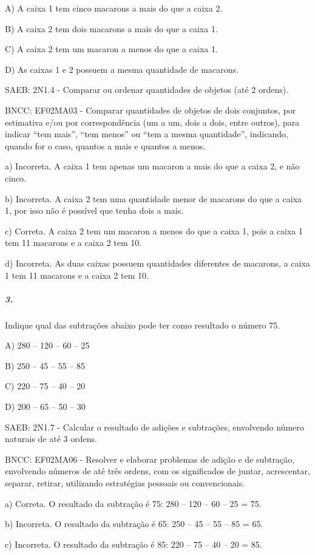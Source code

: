 A) A caixa 1 tem cinco macarons a mais do que a caixa 2.

B) A caixa 2 tem dois macarons a mais do que a caixa 1.

C) A caixa 2 tem um macaron a menos do que a caixa 1.

D) As caixas 1 e 2 possuem a mesma quantidade de macarons.

SAEB: 2N1.4 - Comparar ou ordenar quantidades de objetos (até 2 ordens).

BNCC: EF02MA03 - Comparar quantidades de objetos de dois conjuntos, por
estimativa e/ou por correspondência (um a um, dois a dois, entre
outros), para indicar ``tem mais'', ``tem menos'' ou ``tem a mesma
quantidade'', indicando, quando for o caso, quantos a mais e quantos a
menos.

a) Incorreta. A caixa 1 tem apenas um macaron a mais do que a caixa 2, e
não cinco.

b) Incorreta. A caixa 2 tem uma quantidade menor de macarons do que a
caixa 1, por isso não é possível que tenha dois a mais.

c) Correta. A caixa 2 tem um macaron a menos do que a caixa 1, pois a
caixa 1 tem 11 macarons e a caixa 2 tem 10.

d) Incorreta. As duas caixas possuem quantidades diferentes de macarons,
a caixa 1 tem 11 macarons e a caixa 2 tem 10.

\subparagraph{3. }\label{section-147}

Indique qual das subtrações abaixo pode ter como resultado o número 75.

A) 280 -- 120 -- 60 -- 25

B) 250 -- 45 -- 55 -- 85

C) 220 -- 75 -- 40 -- 20

D) 200 -- 65 -- 50 -- 30

SAEB: 2N1.7 - Calcular o resultado de adições e subtrações, envolvendo
número naturais de até 3 ordens.

BNCC: EF02MA06 - Resolver e elaborar problemas de adição e de subtração,
envolvendo números de até três ordens, com os significados de juntar,
acrescentar, separar, retirar, utilizando estratégias pessoais ou
convencionais.

a) Correta. O resultado da subtração é 75: 280 -- 120 -- 60 -- 25 = 75.

b) Incorreta. O resultado da subtração é 65: 250 -- 45 -- 55 -- 85 = 65.

c) Incorreta. O resultado da subtração é 85: 220 -- 75 -- 40 -- 20 = 85.

